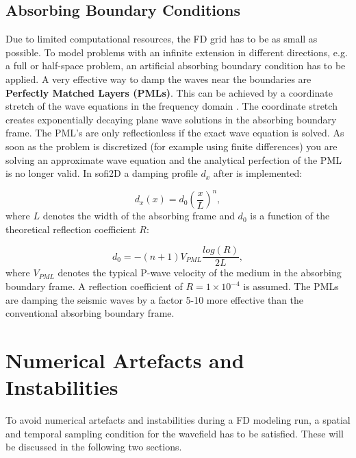 \documentclass[11pt,onecolumn,oneside]{article}
\begin{document}
\subsection{Absorbing Boundary Conditions}
Due to limited computational resources, the FD grid has to be as small as possible. To model problems with an infinite extension in different directions, e.g. a full or half-space problem,  an artificial absorbing boundary condition has to be applied. A very effective way to damp the waves near the boundaries are {\bf{Perfectly Matched Layers (PMLs)}}. This can be achieved by a coordinate stretch of the wave equations in the
frequency domain \cite{komatitsch:07}. The coordinate stretch creates exponentially decaying plane wave solutions in the absorbing boundary frame. The PML's are only
reflectionless if the exact wave equation is solved. As soon as the problem is discretized (for example using finite differences) you are solving an approximate wave equation and
the analytical perfection of the PML is no longer valid. In sofi2D a damping profile $d_x$ after \cite{collino2001application} is implemented:

\begin{equation}
d_x(x)=d_0\left( \frac{x}{L}\right) ^n,
\end{equation}
where $L$ denotes the width of the absorbing frame and $d_0$ is a function of the theoretical reflection coefficient $R$:

\begin{equation}
d_0=-\left( n+1\right) V_{PML}\frac{log(R)}{2L},
\end{equation}
where $V_{PML}$ denotes the typical P-wave velocity of the medium in the absorbing boundary frame. A reflection coefficient of $R=1 \times 10^{-4}$ is assumed.
The PMLs are damping the seismic waves by a factor 5-10 more effective than the conventional absorbing boundary frame.
\clearpage
\section{Numerical Artefacts and Instabilities}\label{num_instab}
To avoid numerical artefacts and instabilities during a FD modeling run, a spatial and temporal sampling condition for the wavefield has to be satisfied. These will be discussed in the following two sections. 
\end{document}
